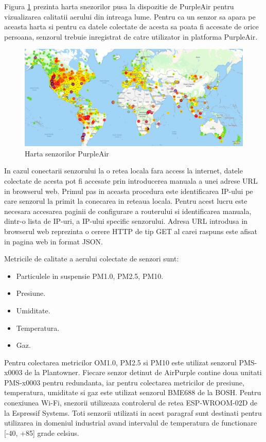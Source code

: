 Figura \ref{fig:sb_purpleairmap} prezinta harta snezorilor pusa la dispozitie de PurpleAir pentru vizualizarea calitatii aerului din intreaga lume. Pentru 
ca un senzor sa apara pe aceasta harta si pentru ca datele colectate de acesta sa poata fi accesate de orice persoana, senzorul trebuie inregistrat de catre 
utilizator in platforma PurpleAir. 
\begin{figure}[H]
    \centering
    \includegraphics[scale=0.35]{figs/sb_purpleairmap.png}
    \caption{Harta senzorilor PurpleAir}
    \label{fig:sb_purpleairmap}
\end{figure}

In cazul conectarii senzorului la o retea locala fara access la internet, datele colectate de acesta pot fi accesate prin introducerea manuala a unei adrese 
URL in browserul web. Primul pas in aceasta procedura este identificarea IP-ului pe care senzorul la primit la conecarea in reteaua locala. Pentru acest lucru 
este necesara accesarea paginii de configurare a routerului si identificarea manuala, dintr-o lista de IP-uri, a IP-ului specific senzorului. Adresa URL 
introdusa in browserul web reprezinta o cerere HTTP de tip GET al carei raspuns este afisat in pagina web in format JSON.

Metricile de calitate a aerului colectate de senzori sunt:
\begin{itemize}
	\item Particulele in suspensie PM1.0, PM2.5, PM10.
	\item Presiune.
	\item Umiditate.
	\item Temperatura.
	\item Gaz.
\end{itemize}
Pentru colectarea metricilor OM1.0, PM2.5 si PM10 este utilizat senzorul PMS-x0003 de la Plantowner. Fiecare senzor detinut de AirPurple contine doua 
unitati PMS-x0003 pentru redundanta, iar pentru colectarea metricilor de presiune, temperatura, umiditate si gaz este utilizat senzorul BME688 de la BOSH. Pentru 
conexiunea Wi-Fi, snezorii utilizeaza controlerul de retea ESP-WROOM-02D de la Espressif Systems. Toti senzorii utilizati in acest paragraf sunt destinati pentru 
utilizarea in domeniul industrial avand intervalul de temperatura de functionare [-40, +85] grade celsius.

